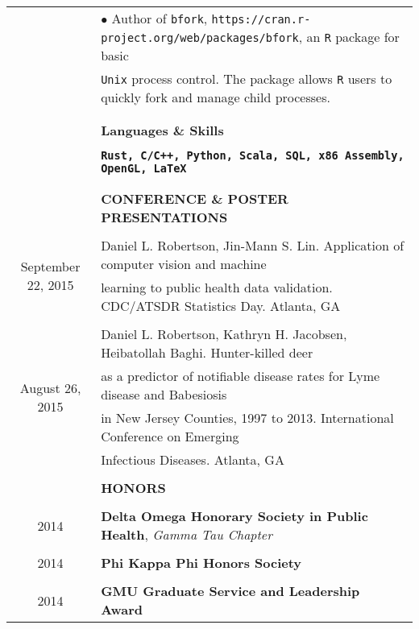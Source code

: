 \documentclass[10pt]{article}
\begin{document}
\begin{table}[ht]
\begin{tabular}{@{\hspace{0mm}}c@{\hspace{1mm}}c@{\hspace{3mm}}cl}
            & & & $\bullet$ Author of \texttt{bfork}, \texttt{https://cran.r-project.org/web/packages/bfork}, an \texttt{R} package for basic\\
            & & & \hspace*{3mm}\texttt{Unix} process control. The package allows \texttt{R} users to quickly fork and manage child processes.\\
            \\
            & & & \color{maroon}{\rule{14cm}{0.75pt}}\\
            & & & \large{\textbf{Languages \& Skills}}\\
            & & & \color{maroon}{\rule{14cm}{0.75pt}}\\
            \multicolumn{3}{c}{} & \textbf{\texttt{Rust, C/C++, Python, Scala, SQL, x86 Assembly, OpenGL, \LaTeX}}\\
            \\
            & & & \color{maroon}{\rule{14cm}{0.75pt}}\\
            & & & \large{\textbf{CONFERENCE \& POSTER PRESENTATIONS}}\\
            & & & \color{maroon}{\rule{14cm}{0.75pt}}\\
            \multicolumn{3}{c}{\multirow{2}{*}{September 22, 2015}} & Daniel L. Robertson, Jin-Mann S. Lin. Application of computer vision and machine\\
            & & & learning to public health data validation. CDC/ATSDR Statistics Day. Atlanta, GA\\
            \\
            \multicolumn{3}{c}{\multirow{4}{*}{August 26, 2015}} & Daniel L. Robertson, Kathryn H. Jacobsen, Heibatollah Baghi. Hunter-killed deer\\
            & & & as a predictor of notifiable disease rates for Lyme disease and Babesiosis\\
            & & & in New Jersey Counties, 1997 to 2013. International Conference on Emerging\\
            & & & Infectious Diseases. Atlanta, GA\\
            & & & \color{maroon}{\rule{14cm}{0.75pt}}\\
            & & & \large{\textbf{HONORS}}\\
            & & & \color{maroon}{\rule{14cm}{0.75pt}}\\
            \multicolumn{3}{c}{2014} & \textbf{Delta Omega Honorary Society in Public Health}, \textit{Gamma Tau Chapter}\\
            \\
            \multicolumn{3}{c}{2014} & \textbf{Phi Kappa Phi Honors Society}\\
            \\
            \multicolumn{3}{c}{2014} & \textbf{GMU Graduate Service and Leadership Award}\\
        \end{tabular}
    \end{table}
\end{document}

